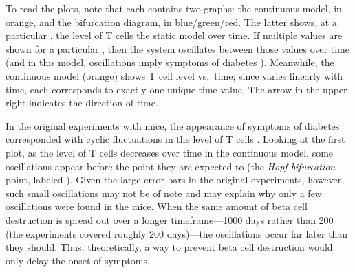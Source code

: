 To read the plots, note that each contains two graphs: the continuous model,
in orange, and the bifurcation diagram, in blue/green/red. The latter shows,
at a particular , the level of T cells the static model
 over time. If multiple values are shown for a
particular , then the system oscillates between those values
over time (and in this model, oscillations imply symptoms of diabetes
\cite{Mahaffy2007}). Meanwhile, the continuous model (orange) shows T cell
level vs.\ time; since  varies linearly with time, each
 corresponds to exactly one unique time value. The arrow in
the upper right indicates the direction of time.

In the original experiments with mice, the appearance of symptoms of
diabetes corresponded with cyclic fluctuations in the level of T cells
\cite{Trudeau2003}. Looking at the first plot, as the level of T cells
decreases over time in the continuous model, some oscillations appear before
the point they are expected to (the {\em Hopf bifurcation} point, labeled
). Given the large error bars in the original experiments,
however, such small oscillations may not be of note and may explain why only
a few oscillations were found in the mice. When the same amount of beta cell
destruction is spread out over a longer timeframe—1000 days rather than 200
(the experiments covered roughly 200 days)—the oscillations occur far later
than they should. Thus, theoretically, a way to prevent beta cell
destruction would only delay the onset of symptoms.
